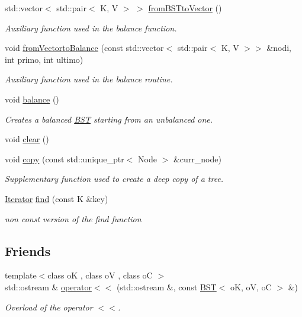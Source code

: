 \begin{DoxyCompactItemize}
std\+::vector$<$ std\+::pair$<$ K, V $>$ $>$ \hyperlink{classBST_a1f96234b9a71bdb4c2edd88b0ef80743}{from\+B\+S\+Tto\+Vector} ()
\begin{DoxyCompactList}\small\item\em Auxiliary function used in the balance function. \end{DoxyCompactList}\item 
void \hyperlink{classBST_abdb2fbf5e98852e77cf2d576d6944795}{from\+Vectorto\+Balance} (const std\+::vector$<$ std\+::pair$<$ K, V $>$$>$ \&nodi, int primo, int ultimo)
\begin{DoxyCompactList}\small\item\em Auxiliary function used in the balance routine. \end{DoxyCompactList}\item 
\mbox{\label{classBST_a06274e4538ebbf7630058aa2da577ffe}} 
void \hyperlink{classBST_a06274e4538ebbf7630058aa2da577ffe}{balance} ()
\begin{DoxyCompactList}\small\item\em Creates a balanced \hyperlink{classBST}{B\+ST} starting from an unbalanced one. \end{DoxyCompactList}\item 
void \hyperlink{classBST_ab126433ade0fa5711341d80cd6a498ff}{clear} ()
\item 
void \hyperlink{classBST_ae7caa3e87e5840631ecd016dcddca593}{copy} (const std\+::unique\+\_\+ptr$<$ Node $>$ \&curr\+\_\+node)
\begin{DoxyCompactList}\small\item\em Supplementary function used to create a deep copy of a tree. \end{DoxyCompactList}\item 
\mbox{\label{classBST_af4fdcab3a5e76bc3f1b75241caae4f99}} 
\hyperlink{classBST_1_1Iterator}{Iterator} \hyperlink{classBST_af4fdcab3a5e76bc3f1b75241caae4f99}{find} (const K \&key)
\begin{DoxyCompactList}\small\item\em non const version of the find function \end{DoxyCompactList}\end{DoxyCompactItemize}
\subsection*{Friends}
\begin{DoxyCompactItemize}
\item 
{\footnotesize template$<$class oK , class oV , class oC $>$ }\\std\+::ostream \& \hyperlink{classBST_abf0033be2689fd4cfbeee149b114536b}{operator$<$$<$} (std\+::ostream \&, const \hyperlink{classBST}{B\+ST}$<$ oK, oV, oC $>$ \&)
\begin{DoxyCompactList}\small\item\em Overload of the operator $<$$<$. \end{DoxyCompactList}\end{DoxyCompactItemize}


